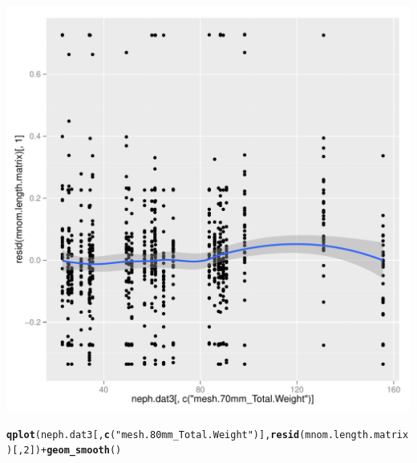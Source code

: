 \documentclass[12pt]{article}\usepackage[]{graphicx}\usepackage[]{color}
\makeatletter
\def\maxwidth{ %
  \ifdim\Gin@nat@width>\linewidth
    \linewidth
  \else
    \Gin@nat@width
  \fi
}
\newcommand{\hlnum}[1]{\textcolor[rgb]{0.686,0.059,0.569}{#1}}%
\newcommand{\hlstr}[1]{\textcolor[rgb]{0.192,0.494,0.8}{#1}}%
\newcommand{\hlopt}[1]{\textcolor[rgb]{0,0,0}{#1}}%
\newcommand{\hlstd}[1]{\textcolor[rgb]{0.345,0.345,0.345}{#1}}%
\newcommand{\hlkwd}[1]{\textcolor[rgb]{0.737,0.353,0.396}{\textbf{#1}}}%
\newenvironment{kframe}{%
 \def\at@end@of@kframe{}%
 \ifinner\ifhmode%
  \def\at@end@of@kframe{\end{minipage}}%
  \begin{minipage}{\columnwidth}%
 \fi\fi%
 \def\FrameCommand##1{\hskip\@totalleftmargin \hskip-\fboxsep
 \colorbox{shadecolor}{##1}\hskip-\fboxsep
     \hskip-\linewidth \hskip-\@totalleftmargin \hskip\columnwidth}%
 \MakeFramed {\advance\hsize-\width
   \@totalleftmargin\z@ \linewidth\hsize
   \@setminipage}}%
 {\par\unskip\endMakeFramed%
 \at@end@of@kframe}
\newenvironment{knitrout}{}{} %
\makeatother
\begin{document}
\begin{knitrout}
\begin{kframe}
{\ttfamily\noindent\itshape{}}\end{kframe}
\includegraphics[width=\maxwidth]{figure/unnamed-chunk-9-2} 
\begin{kframe}\begin{alltt}
\hlkwd{qplot}\hlstd{(neph.dat3[,} \hlkwd{c}\hlstd{(}\hlstr{"mesh.80mm_Total.Weight"}\hlstd{)],} \hlkwd{resid}\hlstd{(mnom.length.matrix)[,}\hlnum{2}\hlstd{])} \hlopt{+} \hlkwd{geom_smooth}\hlstd{()}
\end{alltt}



\end{kframe}
\end{knitrout}
\end{document}
